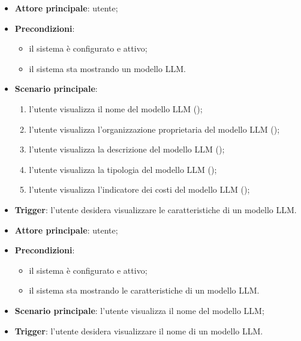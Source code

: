 \documentclass[10pt, a4paper]{article}
\begin{document}
    \begin{itemize}
        \item \textbf{Attore principale}: utente;
        \item \textbf{Precondizioni}:
            \begin{itemize}
                \item il sistema è configurato e attivo;
                \item il sistema sta mostrando un modello LLM.
            \end{itemize}
        \item \textbf{Scenario principale}:
            \begin{enumerate}
                \item l'utente visualizza il nome del modello LLM ();
                \item l'utente visualizza l'organizzazione proprietaria del modello LLM ();
                \item l'utente visualizza la descrizione del modello LLM ();
                \item l'utente visualizza la tipologia del modello LLM ();
                \item l'utente visualizza l'indicatore dei costi del modello LLM ();
            \end{enumerate}
        \item \textbf{Trigger}: l’utente desidera visualizzare le caratteristiche di un modello LLM.
    \end{itemize}

    \begin{itemize}
        \item \textbf{Attore principale}: utente;
        \item \textbf{Precondizioni}:
            \begin{itemize}
                \item il sistema è configurato e attivo;
                \item il sistema sta mostrando le caratteristiche di un modello LLM.
            \end{itemize}
        \item \textbf{Scenario principale}: l'utente visualizza il nome del modello LLM;
        \item \textbf{Trigger}: l’utente desidera visualizzare il nome di un modello LLM.
    \end{itemize}
\end{document}
